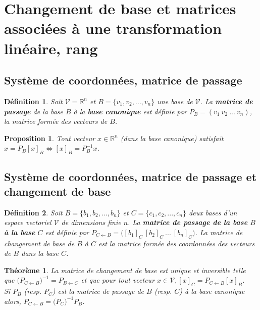 \documentclass{article}[french, babel]
\newtheorem{mydef}{Définition}
\newtheorem{myprop}{Proposition}
\newtheorem{mythm}{Théorème}
\let\stdsection\section
\renewcommand\section{\newpage\stdsection}
\begin{document}
\section{Changement de base et matrices associées à une transformation linéaire, rang}
	\subsection{Système de coordonnées, matrice de passage}
		\begin{mydef}
			Soit $\mathcal{V}=\mathbb{R}^n$ et $B=\{v_1,v_2,...,v_n\}$ une base de $\mathcal{V}$. La \textbf{matrice de passage} de la base $B$ à la \textbf{base canonique} est définie par $P_B=(v_1\:v_2\:...\: v_n)$, la matrice formée des vecteurs de $B$.
		\end{mydef}
		\begin{myprop}
			Tout vecteur $x\in\mathbb{R}^n$ (dans la base canonique) satisfait $x=P_B[x]_B\Longleftrightarrow [x]_B=P_B^{-1}x$.
		\end{myprop}
	\subsection{Système de coordonnées, matrice de passage et changement de base}
		\begin{mydef}
			Soit $B=\{b_1, b_2, ...,b_n\}$ et $C=\{c_1, c_2, ...,c_n\}$ deux bases d'un espace vectoriel $\mathcal{V}$ de dimensions finie $n$. La \textbf{matrice de passage de la base} $B$ \textbf{à la base} $C$ est définie par $P_{C\leftarrow B}=\big([b_1]_C\: [b_2]_C\:...\:[b_n]_C\big)$. La matrice de changement de base de $B$ à $C$ est la matrice formée des coordonnées des vecteurs de $B$ dans la base $C$.
		\end{mydef}
		\begin{mythm}
			La matrice de changement de base est unique et inversible telle que $\big(P_{C\leftarrow B}\big)^{-1}=P_{B\leftarrow C}$ et que pour tout vecteur $x\in\mathcal{V},[x]_C=P_{C\leftarrow B} [x]_B$.
			\\
			Si $P_B$ (resp. $P_C$) est la matrice de passage de $B$ (resp. $C$) à la base canonique alors, $P_{C\leftarrow B}=\big(P_C\big)^{-1}P_B$.
		\end{mythm}
\end{document}
